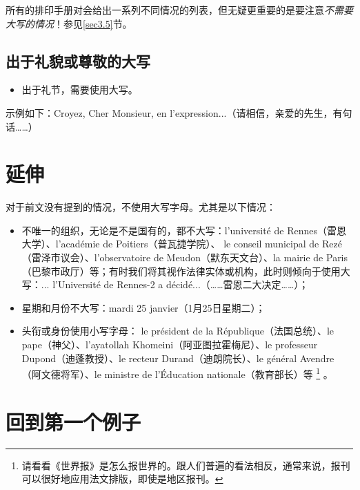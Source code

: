 所有的排印手册对会给出一系列不同情况的列表，但无疑更重要的是要注意\emph{不需要大写的情况}！参见\ref{sec3.5}节。

\subsection{出于礼貌或尊敬的大写}

\begin{itemize}
    \item 出于礼节，需要使用大写。
\end{itemize}

示例如下：Croyez, Cher Monsieur, en l’expression...（请相信，亲爱的先生，有句话……）

\section{延伸}

对于前文没有提到的情况，不使用大写字母。尤其是以下情况：

\begin{itemize}
    \item 不唯一的组织，无论是不是国有的，都不大写：l’université de Rennes（雷恩大学）、l’académie de Poitiers（普瓦捷学院）、 le conseil municipal de Rezé（雷泽市议会）、l’observatoire de Meudon（默东天文台）、la mairie de Paris（巴黎市政厅）等；有时我们将其视作法律实体或机构，此时则倾向于使用大写：... l’Université de Rennes-2 a décidé...（……雷恩二大决定……）；
    \item 星期和月份不大写：mardi 25 janvier（1月25日星期二）；
    \item 头衔或身份使用小写字母： le président de la République（法国总统）、le pape（神父）、l’ayatollah Khomeini（阿亚图拉霍梅尼）、le professeur Dupond（迪蓬教授）、le recteur Durand（迪朗院长）、le général Avendre（阿文德将军）、le ministre de l’Éducation nationale（教育部长）等
        \footnote{请看看《世界报》是怎么报世界的。跟人们普遍的看法相反，通常来说，报刊可以很好地应用法文排版，即使是地区报刊。}
    。
\end{itemize}

\section{回到第一个例子}

